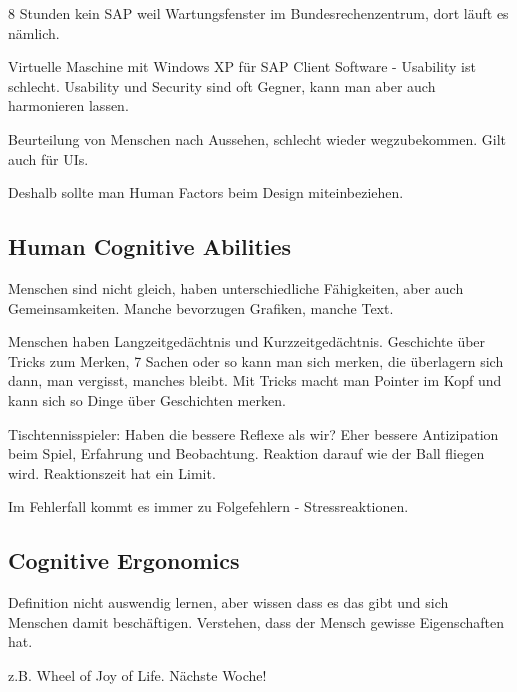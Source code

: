 8 Stunden kein SAP weil Wartungsfenster im Bundesrechenzentrum, dort läuft es
nämlich.

Virtuelle Maschine mit Windows XP für SAP Client Software - Usability ist schlecht.
Usability und Security sind oft Gegner, kann man aber auch harmonieren lassen.

Beurteilung von Menschen nach Aussehen, schlecht wieder wegzubekommen. Gilt
auch für UIs.

Deshalb sollte man Human Factors beim Design miteinbeziehen.

\subsection{Human Cognitive Abilities}
Menschen sind nicht gleich, haben unterschiedliche Fähigkeiten, aber auch 
Gemeinsamkeiten. Manche bevorzugen Grafiken, manche Text.

Menschen haben Langzeitgedächtnis und Kurzzeitgedächtnis. 
Geschichte über Tricks zum Merken, 7 Sachen oder so kann man sich merken,
die überlagern sich dann, man vergisst, manches bleibt. Mit Tricks macht man
Pointer im Kopf und kann sich so Dinge über Geschichten merken.

Tischtennisspieler: Haben die bessere Reflexe als wir? Eher bessere
Antizipation beim Spiel, Erfahrung und Beobachtung. Reaktion darauf wie der Ball
fliegen wird.
Reaktionszeit hat ein Limit. 

Im Fehlerfall kommt es immer zu Folgefehlern - Stressreaktionen.

\subsection{Cognitive Ergonomics}
Definition nicht auswendig lernen, aber wissen dass es das gibt und sich
Menschen damit beschäftigen. Verstehen, dass der Mensch gewisse Eigenschaften hat.

z.B. Wheel of Joy of Life. Nächste Woche!
